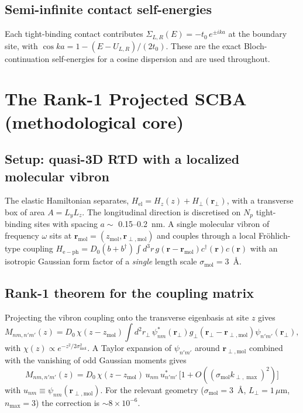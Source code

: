 \documentclass[11pt,a4paper,onecolumn]{article}
\begin{document}
\subsection{Semi-infinite contact self-energies}
Each tight-binding contact contributes $\Sigma_{L,R}(E) = -t_0\,e^{\pm i k a}$
at the boundary site, with $\cos ka = 1 - (E - U_{L,R})/(2t_0)$. These are
the exact Bloch-continuation self-energies for a cosine dispersion and are
used throughout.

\section{The Rank-1 Projected SCBA (methodological core)}
\label{sec:rank1}

\subsection{Setup: quasi-3D RTD with a localized molecular vibron}
The elastic Hamiltonian separates,
$H_{\mathrm{el}} = H_z(z) + H_\perp(\mathbf r_\perp)$,
with a transverse box of area $A = L_y L_z$. The longitudinal direction is
discretised on $N_p$ tight-binding sites with spacing $a \sim$ 0.15--0.2~nm.
A single molecular vibron of frequency $\omega$ sits at
$\mathbf r_{\mathrm{mol}} = (z_{\mathrm{mol}}, \mathbf r_{\perp,
\mathrm{mol}})$ and couples through a local Fr\"ohlich-type coupling
$H_{\mathrm{e-ph}} = D_0 (b + b^\dagger) \!\int\! d^3 r\,
g(\mathbf r - \mathbf r_{\mathrm{mol}}) c^\dagger(\mathbf r) c(\mathbf r)$
with an isotropic Gaussian form factor of a \emph{single} length scale
$\sigma_{\mathrm{mol}} = 3$~\AA.

\subsection{Rank-1 theorem for the coupling matrix}
Projecting the vibron coupling onto the transverse eigenbasis at site $z$
gives
\begin{equation}
M_{nm,n'm'}(z) = D_0\,\chi(z - z_{\mathrm{mol}})\!\int\!d^2 r_\perp\,
\psi^*_{nm}(\mathbf r_\perp) g_\perp(\mathbf r_\perp - \mathbf r_{\perp,\mathrm{mol}}) \psi_{n'm'}(\mathbf r_\perp),
\end{equation}
with $\chi(z) \propto e^{-z^2/2\sigma_{\mathrm{mol}}^2}$. A Taylor expansion
of $\psi_{n'm'}$ around $\mathbf r_{\perp,\mathrm{mol}}$ combined with the
vanishing of odd Gaussian moments gives
\begin{equation}
\boxed{\;M_{nm,n'm'}(z) = D_0\,\chi(z - z_{\mathrm{mol}})\,u_{nm}\,u^*_{n'm'}\,\bigl[1 + O((\sigma_{\mathrm{mol}} k_{\perp,\max})^2)\bigr]\;}
\label{eq:rank1-factor}
\end{equation}
with $u_{nm} \equiv \psi_{nm}(\mathbf r_{\perp,\mathrm{mol}})$. For the
relevant geometry ($\sigma_{\mathrm{mol}} = 3$~\AA, $L_\perp = 1\,\mu$m,
$n_{\max} = 3$) the correction is $\sim 8 \times 10^{-6}$.
\end{document}
